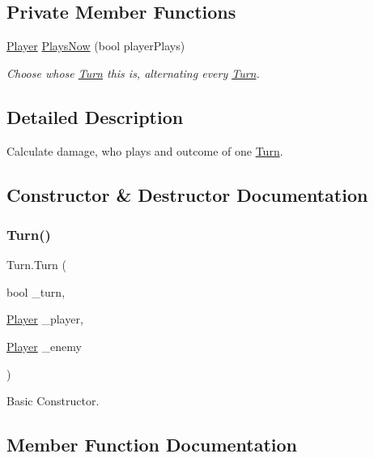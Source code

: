 \subsection*{Private Member Functions}
\begin{DoxyCompactItemize}
\item 
\mbox{\hyperlink{class_player}{Player}} \mbox{\hyperlink{class_turn_a5dca683e4c9687227519db8872af3830}{Plays\+Now}} (bool player\+Plays)
\begin{DoxyCompactList}\small\item\em Choose whose \mbox{\hyperlink{class_turn}{Turn}} this is, alternating every \mbox{\hyperlink{class_turn}{Turn}}. \end{DoxyCompactList}\end{DoxyCompactItemize}


\subsection{Detailed Description}
Calculate damage, who plays and outcome of one \mbox{\hyperlink{class_turn}{Turn}}. 

\subsection{Constructor \& Destructor Documentation}
\mbox{\label{class_turn_a573bc57fc636b4699b476aed4c1278ba}} 
\subsubsection{\texorpdfstring{Turn()}{Turn()}}
{\footnotesize\ttfamily Turn.\+Turn (\begin{DoxyParamCaption}\item[{bool}]{\+\_\+turn,  }\item[{\mbox{\hyperlink{class_player}{Player}}}]{\+\_\+player,  }\item[{\mbox{\hyperlink{class_player}{Player}}}]{\+\_\+enemy }\end{DoxyParamCaption})\hspace{0.3cm}{\ttfamily [inline]}}



Basic Constructor. 



\subsection{Member Function Documentation}
\mbox{\label{class_turn_a5dca683e4c9687227519db8872af3830}} 
